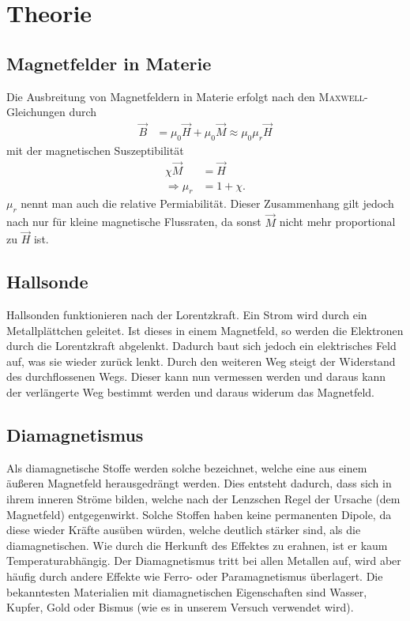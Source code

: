 \documentclass[12pt,a4paper,titlepage,headinclude,bibtotoc]{scrartcl}
\begin{document}
\section{Theorie}
\label{sec:theorie}
\subsection{Magnetfelder in Materie}
Die Ausbreitung von Magnetfeldern in Materie erfolgt nach den \textsc{Maxwell}-Gleichungen durch
\begin{align}
	\vec B&=\mu_0\vec H+\mu_0\vec M\approx\mu_0\mu_r\vec H
\end{align}
mit der magnetischen Suszeptibilität
\begin{align}
	\chi\vec M&=\vec H\\
	\Rightarrow\mu_r&=1+\chi .
\end{align}
$\mu _r$ nennt man auch die relative Permiabilität.
Dieser Zusammenhang gilt jedoch nach \cite[S. 112]{demtroeder2} nur für kleine magnetische Flussraten, da sonst $\vec M$ nicht mehr proportional zu $\vec H$ ist.

\subsection{Hallsonde}
Hallsonden funktionieren nach der Lorentzkraft.
Ein Strom wird durch ein Metallplättchen geleitet.
Ist dieses in einem Magnetfeld, so werden die Elektronen durch die Lorentzkraft abgelenkt.
Dadurch baut sich jedoch ein elektrisches Feld auf, was sie wieder zurück lenkt.
Durch den weiteren Weg steigt der Widerstand des durchflossenen Wegs.
Dieser kann nun vermessen werden und daraus kann der verlängerte Weg bestimmt werden und daraus widerum das Magnetfeld.

\subsection{Diamagnetismus}
Als diamagnetische Stoffe werden solche bezeichnet, welche eine aus einem äußeren Magnetfeld herausgedrängt werden.
Dies entsteht dadurch, dass sich in ihrem inneren Ströme bilden, welche nach der Lenzschen Regel der Ursache (dem Magnetfeld) entgegenwirkt. 
Solche Stoffen haben keine permanenten Dipole, da diese wieder Kräfte ausüben würden, welche deutlich stärker sind, als die diamagnetischen. 
Wie durch die Herkunft des Effektes zu erahnen, ist er kaum Temperaturabhängig.
Der Diamagnetismus tritt bei allen Metallen auf, wird aber häufig durch andere Effekte wie Ferro- oder Paramagnetismus überlagert.
Die bekanntesten Materialien mit diamagnetischen Eigenschaften sind Wasser, Kupfer, Gold oder Bismus (wie es in unserem Versuch verwendet wird).
\end{document}
